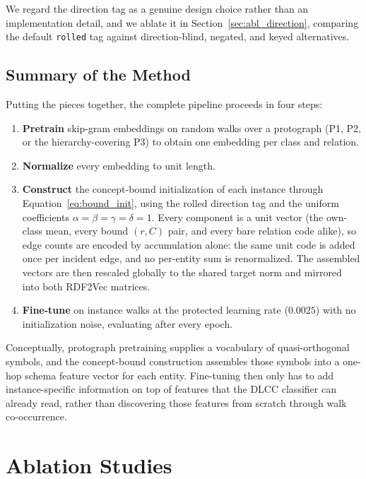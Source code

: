 \documentclass[a4paper,oneside,bibliography=totoc]{scrbook}
\begin{document}
We regard the direction tag as a genuine design choice rather than an
implementation detail, and we ablate it in Section~\ref{sec:abl_direction},
comparing the default \texttt{rolled} tag against direction-blind, negated, and
keyed alternatives.

\subsection{Summary of the Method}
\label{sec:method_summary}

Putting the pieces together, the complete pipeline proceeds in four steps:

\begin{enumerate}
  \item \textbf{Pretrain} skip-gram embeddings on random walks over a
    protograph (P1, P2, or the hierarchy-covering P3) to obtain one embedding
    per class and relation.
  \item \textbf{Normalize} every embedding to unit length.
  \item \textbf{Construct} the concept-bound initialization of each instance
    through Equation~\eqref{eq:bound_init}, using the rolled direction tag and
    the uniform coefficients $\alpha = \beta = \gamma = \delta = 1$. Every
    component is a unit vector (the own-class mean, every bound $(r, C)$ pair,
    and every bare relation code alike), so edge counts are encoded by
    accumulation alone: the same unit code is added once per incident edge, and
    no per-entity sum is renormalized. The assembled vectors are then rescaled
    globally to the shared target norm and mirrored into both RDF2Vec matrices.
  \item \textbf{Fine-tune} on instance walks at the protected learning rate
    ($0.0025$) with no initialization noise, evaluating after every epoch.
\end{enumerate}

Conceptually, protograph pretraining supplies a vocabulary of quasi-orthogonal
symbols, and the concept-bound construction assembles those symbols into a
one-hop schema feature vector for each entity. Fine-tuning then only has to add
instance-specific information on top of features that the DLCC classifier can
already read, rather than discovering those features from scratch through walk
co-occurrence.

\section{Ablation Studies}
\label{sec:ablations}
\end{document}
